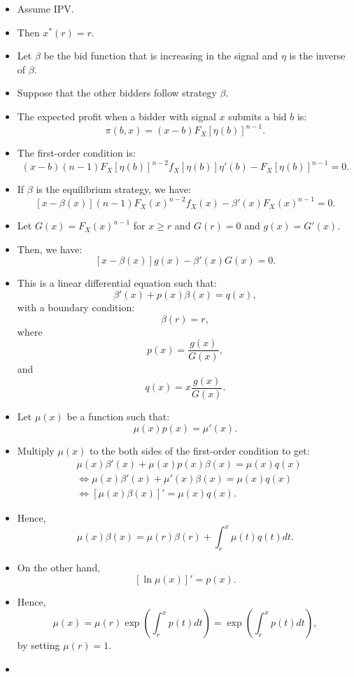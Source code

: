 \documentclass[]{book}
\begin{document}
\begin{itemize}
\item
  Assume IPV.
\item
  Then \(x^*(r) = r\).
\item
  Let \(\beta\) be the bid function that is increasing in the signal and
  \(\eta\) is the inverse of \(\beta\).
\item
  Suppose that the other bidders follow strategy \(\beta\).
\item
  The expected profit when a bidder with signal \(x\) submits a bid
  \(b\) is: \[
  \pi(b, x) = (x - b) F_X[\eta(b)]^{n - 1}.
  \]
\item
  The first-order condition is: \[
  (x - b) (n - 1) F_X[\eta(b)]^{n - 2} f_X[\eta(b)] \eta'(b)- F_X[\eta(b)]^{n - 1} = 0.
  \]
\item
  If \(\beta\) is the equilibrium strategy, we have: \[
  [x - \beta(x)] (n - 1) F_X(x)^{n - 2} f_X(x) - \beta'(x) F_X(x)^{n - 1} = 0.
  \]
\item
  Let \(G(x) = F_X(x)^{n - 1}\) for \(x \ge r\) and \(G(r) = 0\) and
  \(g(x) = G'(x)\).
\item
  Then, we have: \[
  [x - \beta(x)] g(x) - \beta'(x) G(x) = 0.
  \]
\item
  This is a linear differential equation such that: \[
  \beta'(x) + p(x) \beta(x) = q(x),
  \] with a boundary condition: \[
  \beta(r) = r,
  \] where \[
  p(x) = \frac{g(x)}{G(x)},
  \] and \[
  q(x) = x \frac{g(x)}{G(x)}.
  \]
\item
  Let \(\mu(x)\) be a function such that: \[
  \mu(x) p(x) = \mu'(x).
  \]
\item
  Multiply \(\mu(x)\) to the both sides of the first-order condition to
  get: \[
  \begin{split}
  &\mu(x) \beta'(x) + \mu(x) p(x) \beta(x) = \mu(x) q(x)\\
  &\Leftrightarrow \mu(x) \beta'(x) + \mu'(x) \beta(x) = \mu(x) q(x)\\
  &\Leftrightarrow [\mu(x) \beta(x)]' = \mu(x) q(x).
  \end{split}
  \]
\item
  Hence, \[
  \mu(x) \beta(x) = \mu(r) \beta(r) + \int_{r}^x \mu(t) q(t) dt.
  \]
\item
  On the other hand, \[
  [\ln \mu(x)]' = p(x).
  \]
\item
  Hence, \[
  \mu(x) = \mu(r) \exp\left(\int_{r}^x p(t) dt  \right) = \exp\left(\int_{r}^x p(t) dt  \right),
  \] by setting \(\mu(r) = 1\).
\item

\end{itemize}
\end{document}
